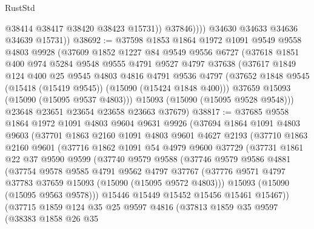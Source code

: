 \begin{lexlean}{RustStd}
\begin{coremodule}
                    @38414
                    @38417
                    @38420
                    @38423
                    @15731))
                @37846))))
        @34630
        @34633
        @34636
        @34639
        @15731))
@38692 := @37598
    @1853
    @1864
    @1972
    @1091
    @9549
    @9558
    @4803
    @9928
    (@37609
      @1852
      @1227
      @84
      @9549
      @9556
      @6727
      (@37618
        @1851
        @400
        @974
        @5284
        @9548
        @9555
        @4791
        @9527
        @4797
        @37638
        (@37617
          @1849
          @124
          @400
          @25
          @9545
          @4803
          @4816
          @4791
          @9536
          @4797
          (@37652 @1848 @9545 (@15418 (@15419 @9545)) (@15090 (@15424 @1848 @400)))
          @37659
          @15093
          (@15090 (@15095 @9537 @4803)))
        @15093
        (@15090 (@15095 @9528 @9548)))
      @23648
      @23651
      @23654
      @23658
      @23663
      @37679)
@38817 := @37685
    @9558
    @1864
    @1972
    @1091
    @4803
    @9604
    @9631
    @9926
    (@37694
      @1864
      @1091
      @4803
      @9603
      (@37701
        @1863
        @2160
        @1091
        @4803
        @9601
        @4627
        @2193
        (@37710
          @1863
          @2160
          @9601
          (@37716
            @1862
            @1091
            @54
            @4979
            @9600
            @37729
            (@37731
              @1861
              @22
              @37
              @9590
              @9599
              (@37740
                @9579
                @9588
                (@37746
                  @9579
                  @9586
                  @4881
                  (@37754
                    @9578
                    @9585
                    @4791
                    @9562
                    @4797
                    @37767
                    (@37776 @9571 @4797 @37783 @37659 @15093 (@15090 (@15095 @9572 @4803)))
                    @15093
                    (@15090 (@15095 @9563 @9578)))
                  @15446
                  @15449
                  @15452
                  @15456
                  @15461
                  @15467))
              (@37715
                @1859
                @124
                @35
                @25
                @9597
                @4816
                (@37813
                  @1859
                  @35
                  @9597
                  (@38383
                    @1858
                    @26
                    @35

\end{coremodule}
\end{lexlean}
